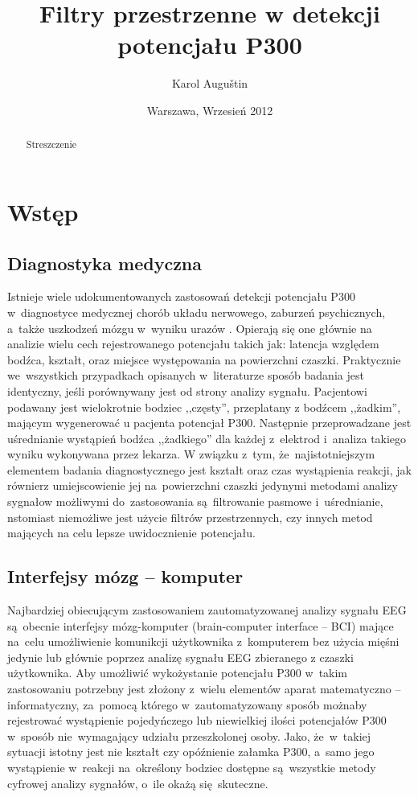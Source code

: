 \documentclass[licencjacka,openright]{pracamgr}
\author{ Karol Auguštin }
\title{ Filtry przestrzenne w detekcji potencjału P300 }
\date{Warszawa, Wrzesień 2012}
\begin{document}
\let\cleardoublepage\clearpage
\maketitle
\begin{abstract}
\par Streszczenie
\end{abstract}
\tableofcontents

\chapter{Wstęp}
\section{Diagnostyka medyczna}
Istnieje wiele udokumentowanych zastosowań detekcji potencjału P300 w~diagnostyce medycznej chorób układu nerwowego, zaburzeń psychicznych, a~także uszkodzeń mózgu w~wyniku urazów \citep{zgorzalewicz2000}. Opierają się one głównie na analizie wielu cech rejestrowanego potencjału takich jak: latencja względem bodźca, kształt, oraz miejsce występowania na powierzchni czaszki. Praktycznie we~wszystkich przypadkach opisanych w~literaturze sposób badania jest identyczny, jeśli porównywany jest od strony analizy sygnału. Pacjentowi podawany jest wielokrotnie bodziec ,,częsty'', przeplatany z bodźcem ,,żadkim'', mającym wygenerować u pacjenta potencjał P300. Następnie przeprowadzane jest uśrednianie wystąpień bodźca ,,żadkiego'' dla każdej z~elektrod i~analiza takiego wyniku wykonywana przez lekarza. W związku z~tym, że~najistotniejszym elementem badania diagnostycznego jest kształt oraz czas wystąpienia reakcji, jak równierz umiejscowienie jej na~powierzchni czaszki jedynymi metodami analizy sygnałow możliwymi do~zastosowania są~filtrowanie pasmowe i~uśrednianie, nstomiast niemożliwe jest użycie filtrów przestrzennych, czy innych metod mających na celu lepsze uwidocznienie potencjału.
\section{Interfejsy mózg -- komputer}
Najbardziej obiecującym zastosowaniem zautomatyzowanej analizy sygnału EEG są~obecnie interfejsy mózg-komputer (brain-computer interface -- BCI) mające na~celu umożliwienie komunikcji użytkownika z~komputerem bez użycia mięśni jedynie lub głównie poprzez analizę sygnału EEG zbieranego z czaszki użytkownika. Aby umożliwić wykożystanie potencjału P300 w~takim zastosowaniu potrzebny jest złożony z~wielu elementów aparat matematyczno -- informatyczny, za~pomocą którego w~zautomatyzowany sposób możnaby rejestrować wystąpienie pojedyńczego lub niewielkiej ilości potencjałów P300 w~sposób nie~wymagający udziału przeszkolonej osoby. Jako, że~w~takiej sytuacji istotny jest nie kształt czy opóźnienie załamka P300, a~samo jego wystąpienie w~reakcji na~określony bodziec dostępne są~wszystkie metody cyfrowej analizy sygnałów, o~ile okażą się~skuteczne.
\end{document}
